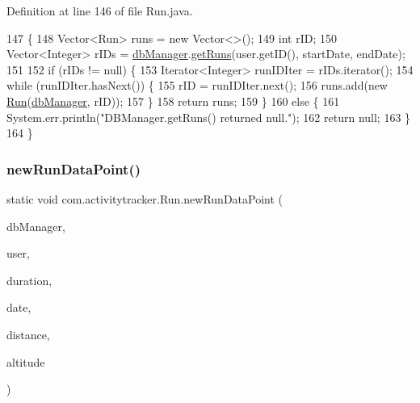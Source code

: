 Definition at line 146 of file Run.\+java.


\begin{DoxyCode}
147                                                                                 \{
148         Vector<Run> runs = \textcolor{keyword}{new} Vector<>();
149         \textcolor{keywordtype}{int} rID;
150         Vector<Integer> rIDs = \mbox{\hyperlink{classcom_1_1activitytracker_1_1_run_ab90e32eda9f4c671ae3575f971edca6b}{dbManager}}.\mbox{\hyperlink{classcom_1_1activitytracker_1_1_d_b_manager_a48d9e51c1b73064b8f773cdde5113928}{getRuns}}(user.getID(), startDate, endDate);
151 
152         \textcolor{keywordflow}{if} (rIDs != null) \{
153             Iterator<Integer> runIDIter = rIDs.iterator();
154             \textcolor{keywordflow}{while} (runIDIter.hasNext()) \{
155                 rID = runIDIter.next();
156                 runs.add(\textcolor{keyword}{new} \mbox{\hyperlink{classcom_1_1activitytracker_1_1_run_a5568c1c514835056d2abc22cfba222c5}{Run}}(\mbox{\hyperlink{classcom_1_1activitytracker_1_1_run_ab90e32eda9f4c671ae3575f971edca6b}{dbManager}}, rID));
157             \}
158             \textcolor{keywordflow}{return} runs;
159         \}
160         \textcolor{keywordflow}{else} \{
161             System.err.println(\textcolor{stringliteral}{"DBManager.getRuns() returned null."});
162             \textcolor{keywordflow}{return} null;
163         \}
164     \}
\end{DoxyCode}
\mbox{\label{classcom_1_1activitytracker_1_1_run_a5dea6f1860431103d553ce770382afe0}} 
\subsubsection{\texorpdfstring{new\+Run\+Data\+Point()}{newRunDataPoint()}}
{\footnotesize\ttfamily static void com.\+activitytracker.\+Run.\+new\+Run\+Data\+Point (\begin{DoxyParamCaption}\item[{final \mbox{\hyperlink{classcom_1_1activitytracker_1_1_d_b_manager}{D\+B\+Manager}}}]{db\+Manager,  }\item[{final \mbox{\hyperlink{classcom_1_1activitytracker_1_1_user}{User}}}]{user,  }\item[{final float}]{duration,  }\item[{final Date}]{date,  }\item[{final float}]{distance,  }\item[{final float}]{altitude }\end{DoxyParamCaption})\hspace{0.3cm}{\ttfamily [static]}}

